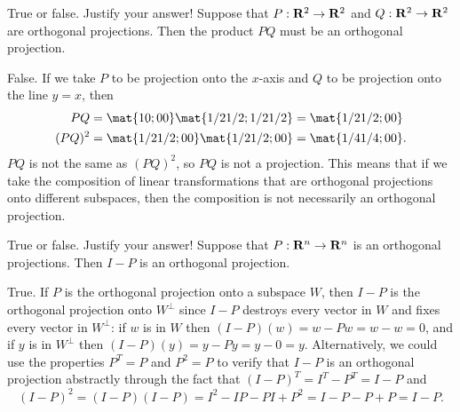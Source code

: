 \begin{problems}
\problem %
True or false. Justify your answer! \newline Suppose that
$P: {\bf R}^2 \to {\bf R}^2$ and $Q: {\bf R}^2 \to {\bf R}^2$ are
orthogonal projections.  Then the product $PQ$ must be an orthogonal
projection.

\begin{solution}
  False.  If we take $P$ to be projection onto the $x$-axis and $Q$
  to be projection onto the line $y=x$, then
  \begin{align*}
    PQ
    & = \mat{1 0; 0 0} \mat{1/2 1/2; 1/2 1/2}
      = \mat{1/2 1/2; 0 0} \\
    (PQ)^2
    & = \mat{1/2 1/2; 0 0} \mat{1/2 1/2; 0 0}=
      \mat{1/4 1/4; 0 0}.
  \end{align*}
  $PQ$ is not the same as $(PQ)^2$, so $PQ$ is not a projection.
  \newline \newline This means that if we take the composition of
  linear transformations that are orthogonal projections onto
  different subspaces, then the composition is not necessarily an
  orthogonal projection.
\end{solution}

\problem%
True or false. Justify your answer! \newline Suppose that
$P: {\bf R}^n \to {\bf R}^n$ is an orthogonal projections.  Then $I-P$
is an orthogonal projection.

\begin{solution}
  True.  If $P$ is the orthogonal projection onto a subspace $W$, then
  $I-P$ is the orthogonal projection onto $W^{\perp}$ since $I-P$
  destroys every vector in $W$ and fixes every vector in $W^{\perp}$:
  if $w$ is in $W$ then $(I-P)(w) = w - Pw = w - w = 0$, and if $y$ is
  in $W^{\perp}$ then $(I-P)(y) = y - Py = y - 0 = y$.  Alternatively,
  we could use the properties $P^T = P$ and $P^2 = P$ to verify that
  $I-P$ is an orthogonal projection abstractly through the fact that
  $(I-P)^T = I^T-P^T = I-P$ and
  \[(I-P)^2 = (I-P)(I-P) = I^2 - IP - PI +P^2 = I-P-P+P = I-P.\]
\end{solution}


\end{problems}\setcounter{problem}{0}


\newpage

